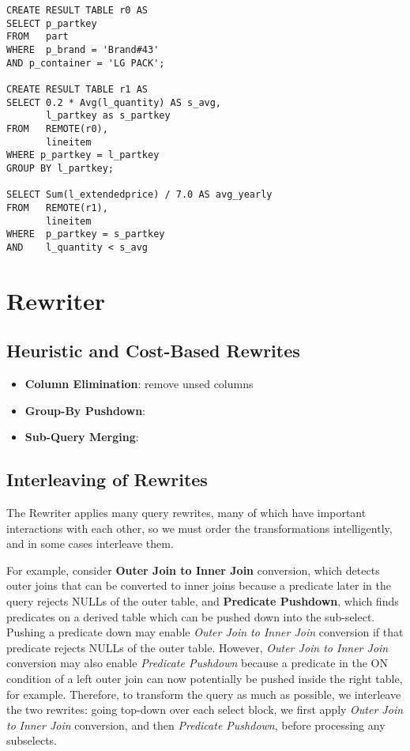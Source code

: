 \documentclass[11pt]{article}
\begin{document}
\begin{verbatim}
CREATE RESULT TABLE r0 AS
SELECT p_partkey
FROM   part
WHERE  p_brand = 'Brand#43'
AND p_container = 'LG PACK';

CREATE RESULT TABLE r1 AS
SELECT 0.2 * Avg(l_quantity) AS s_avg,
       l_partkey as s_partkey
FROM   REMOTE(r0),
       lineitem
WHERE p_partkey = l_partkey
GROUP BY l_partkey;

SELECT Sum(l_extendedprice) / 7.0 AS avg_yearly
FROM   REMOTE(r1),
       lineitem
WHERE  p_partkey = s_partkey
AND    l_quantity < s_avg
\end{verbatim}
\section{Rewriter}
\label{sec:orga94ab5d}
\subsection{Heuristic and Cost-Based Rewrites}
\label{sec:org0a02fb4}
\begin{itemize}
\item \textbf{Column Elimination}: remove unsed columns
\item \textbf{Group-By Pushdown}:
\item \textbf{Sub-Query Merging}:
\end{itemize}
\subsection{Interleaving of Rewrites}
\label{sec:org3f51b4b}
The Rewriter applies many query rewrites, many of which have important interactions with each other,
so we must order the transformations intelligently, and in some cases interleave them.

For example, consider \textbf{Outer Join to Inner Join} conversion, which detects outer joins that can be
converted to inner joins because a predicate later in the query rejects NULLs of the outer table, and
\textbf{Predicate Pushdown}, which finds predicates on a derived table which can be pushed down into the
sub-select. Pushing a predicate down may enable \emph{Outer Join to Inner Join} conversion if that predicate
rejects NULLs of the outer table. However, \emph{Outer Join to Inner Join} conversion may also enable
\emph{Predicate Pushdown} because a predicate in the ON condition of a left outer join can now potentially be
pushed inside the right table, for example. Therefore, to transform the query as much as possible, we
interleave the two rewrites: going top-down over each select block, we first apply \emph{Outer Join to}
\emph{Inner Join} conversion, and then \emph{Predicate Pushdown}, before processing any subselects.
\end{document}
